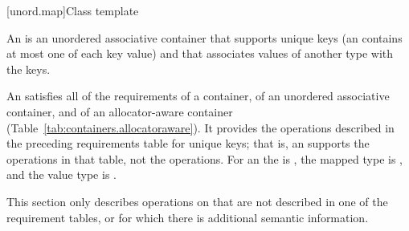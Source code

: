 \documentclass[american,twoside]{book}
\begin{document}
[unord.map]{Class template }
%

\pnum
{}%
%
An  is an unordered associative container that
supports unique keys (an  contains at most one of each
key value) and that associates values of another type
 with the keys.

\pnum
An  satisfies all of the requirements of a container, of an unordered associative container, and of an allocator-aware container (Table~\ref{tab:containers.allocatoraware}). It provides the operations described in the preceding requirements table for unique keys; that is, an  supports the  operations in that table, not the  operations. For an  the  is , the mapped type is , and the value type is .

\pnum
This section only describes operations on  that
are not described in one of the requirement tables, or for which there
is additional semantic information.
\end{document}
